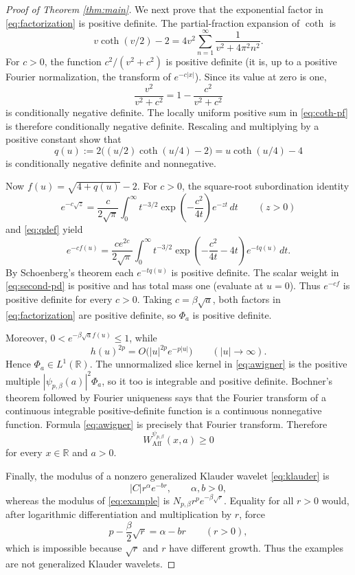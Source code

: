 \documentclass[11pt]{article}
\newcommand{\R}{\mathbb R}
\newcommand{\WAff}{W_{\mathrm{Aff}}}
\begin{document}
\begin{proof}[Proof of Theorem \ref{thm:main}]
We next prove that the exponential factor in \eqref{eq:factorization} is
positive definite. The partial-fraction expansion of \(\coth\) is
\begin{equation}\label{eq:coth-pf}
 v\coth(v/2)-2
 =4v^2\sum_{n=1}^\infty\frac1{v^2+4\pi^2n^2}.
\end{equation}
For \(c>0\), the function
\(c^2/(v^2+c^2)\) is positive definite (it is, up to a positive Fourier
normalization, the transform of \(e^{-c|x|}\)). Since its value at zero is
one,
\[
 \frac{v^2}{v^2+c^2}=1-\frac{c^2}{v^2+c^2}
\]
is conditionally negative definite. The locally uniform positive sum in
\eqref{eq:coth-pf} is therefore conditionally negative definite. Rescaling
and multiplying by a positive constant show that
\begin{equation}\label{eq:qdef}
 q(u):=2\bigl((u/2)\coth(u/4)-2\bigr)
      =u\coth(u/4)-4
\end{equation}
is conditionally negative definite and nonnegative.

Now \(f(u)=\sqrt{4+q(u)}-2\). For \(c>0\), the square-root subordination
identity
\begin{equation}\label{eq:subordination}
 e^{-c\sqrt z}
 =\frac{c}{2\sqrt\pi}\int_0^\infty
 t^{-3/2}\exp\left(-\frac{c^2}{4t}\right)e^{-zt}\,dt
 \qquad(z>0)
\end{equation}
and \eqref{eq:qdef} yield
\begin{equation}\label{eq:second-pd}
 e^{-c f(u)}=
 \frac{c e^{2c}}{2\sqrt\pi}\int_0^\infty
 t^{-3/2}\exp\left(-\frac{c^2}{4t}-4t\right)e^{-tq(u)}\,dt.
\end{equation}
By Schoenberg's theorem each \(e^{-tq(u)}\) is positive definite. The scalar
weight in \eqref{eq:second-pd} is positive and has total mass one (evaluate
at \(u=0\)). Thus \(e^{-cf}\) is positive definite for every \(c>0\).
Taking \(c=\beta\sqrt a\), both factors in \eqref{eq:factorization} are
positive definite, so \(\Phi_a\) is positive definite.

Moreover, \(0<e^{-\beta\sqrt a f(u)}\leq1\), while
\[
 h(u)^{2p}=O\bigl(|u|^{2p}e^{-p|u|}\bigr)
 \qquad(|u|\to\infty).
\]
Hence \(\Phi_a\in L^1(\R)\). The unnormalized slice kernel in
\eqref{eq:awigner} is the positive multiple
\(|\psi_{p,\beta}(a)|^2\Phi_a\), so it too is integrable and positive
definite. Bochner's theorem followed by Fourier uniqueness says that the
Fourier transform of a continuous integrable positive-definite function is a
continuous nonnegative function. Formula \eqref{eq:awigner} is precisely
that Fourier transform. Therefore
\[
 \WAff^{\psi_{p,\beta}}(x,a)\geq0
\]
for every \(x\in\R\) and \(a>0\).

Finally, the modulus of a nonzero generalized Klauder wavelet
\eqref{eq:klauder} is
\[
 |C|r^\alpha e^{-br},\qquad \alpha,b>0,
\]
whereas the modulus of \eqref{eq:example} is
\(N_{p,\beta}r^p e^{-\beta\sqrt r}\). Equality for all \(r>0\) would, after
logarithmic differentiation and multiplication by \(r\), force
\[
 p-\frac{\beta}{2}\sqrt r=\alpha-br
 \qquad(r>0),
\]
which is impossible because \(\sqrt r\) and \(r\) have different growth.
Thus the examples are not generalized Klauder wavelets.
\end{proof}
\end{document}
